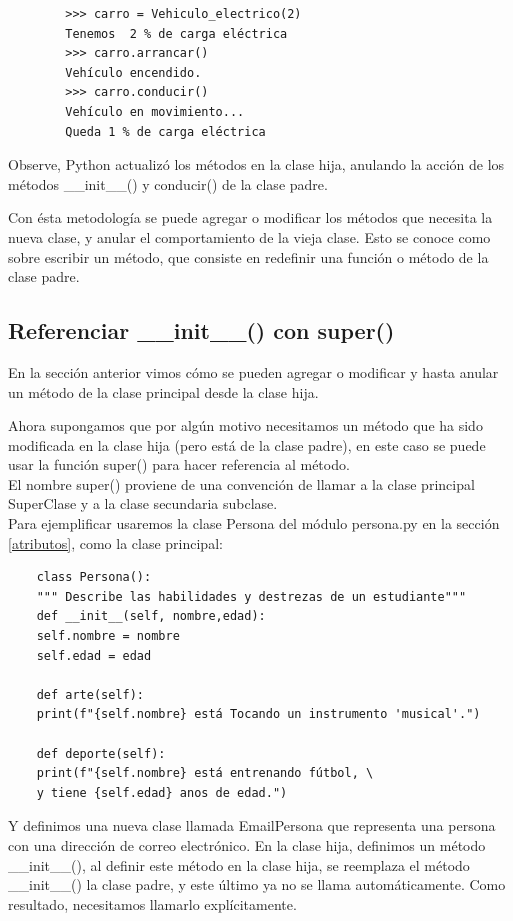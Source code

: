 {{	\begin{lstlisting}
		>>> carro = Vehiculo_electrico(2)
		Tenemos  2 % de carga eléctrica
		>>> carro.arrancar()
		Vehículo encendido.
		>>> carro.conducir()
		Vehículo en movimiento...
		Queda 1 % de carga eléctrica
	\end{lstlisting}
	Observe, Python actualizó los métodos en la clase hija, anulando la acción de los  métodos {\ttfamily\_\!\_init\_\!\_()} y  {\ttfamily conducir()} de la clase padre.  
	
	Con ésta metodología se puede agregar o modificar los métodos que necesita la nueva clase,  y anular el comportamiento de la vieja clase. Esto se conoce como sobre escribir un método, que  consiste en redefinir una función o método  de la clase padre.
	
	
	\subsection{Referenciar \_\!\_init\_\!\_() con super()}}


En la sección anterior vimos cómo se pueden agregar o modificar y hasta anular un método de la clase principal desde la clase hija. 

Ahora supongamos que por algún motivo necesitamos un método que ha sido modificada en la clase hija (pero está de la clase padre), en este caso se puede usar la función {\ttfamily super()} para hacer referencia al método. \\
El nombre {\ttfamily super()} proviene de una convención de llamar a la clase principal {\ttfamily SuperClase} y a la clase secundaria subclase.\\


Para ejemplificar usaremos la clase {\ttfamily Persona} del módulo {\ttfamily persona.py} en la sección \ref{atributos}, como la clase principal: 

\begin{lstlisting}
	class Persona():
	""" Describe las habilidades y destrezas de un estudiante"""
	def __init__(self, nombre,edad):
	self.nombre = nombre
	self.edad = edad
	
	def arte(self):
	print(f"{self.nombre} está Tocando un instrumento 'musical'.") 
	
	def deporte(self):
	print(f"{self.nombre} está entrenando fútbol, \
	y tiene {self.edad} anos de edad.")
\end{lstlisting}
Y definimos una nueva clase llamada {\ttfamily EmailPersona} que representa una persona con una dirección de correo electrónico. En la clase hija, definimos un método {\ttfamily\_\!\_init\_\!\_()}, al definir este método en la clase hija, se  reemplaza el método  {\ttfamily\_\!\_init\_\!\_()} la clase padre, y este último ya no se llama automáticamente. Como resultado,  necesitamos llamarlo explícitamente. 

}
